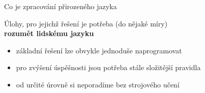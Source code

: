 \documentclass[handout,aspectratio=169,dvipsnames]{beamer}
\begin{document}
\begin{frame}{Co je zpracování přirozeného jazyka}

    \begin{center}

        \Large Úlohy, pro jejichž řešení je potřeba (do nějaké míry) \\ \textbf{rozumět
        lidskému jazyku}

    \end{center}

    \begin{itemize}[<+->]

        \item<2-> základní řešení lze obvykle jednoduše naprogramovat

        \item<3-> pro zvýšení úspěšnosti jsou potřeba stále složitější pravidla

        \item<4-> od určité úrovně si neporadíme bez strojového učení

    \end{itemize}

\end{frame}

\end{document}
